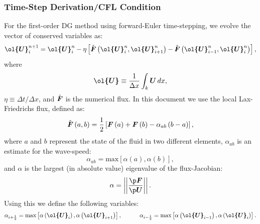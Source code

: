 \documentclass[10pt,preprint]{aastex}
\begin{document}
\subsubsection{Time-Step Derivation/CFL Condition}
For the first-order DG method using forward-Euler time-stepping, we evolve the vector of conserved variables as:
\begin{equation}\label{Eq:1stOrderDG}
    \vect{\ol{U}}^{n+1}_{i}=\vect{\ol{U}}^{n}_{i}-\eta\left[\hat{\vect{F}}\left(\vect{\ol{U}}^{n}_{i},\vect{\ol{U}}^{n}_{i+1}\right)-\hat{\vect{F}}\left(\vect{\ol{U}}^{n}_{i-1},\vect{\ol{U}}^{n}_{i}\right)\right],
\end{equation}
where
\begin{equation*}
    \vect{\ol{U}}\equiv\f{1}{\Delta x}\int_{k}\vect{U}\,dx,
\end{equation*}
$\eta\equiv\Delta t/\Delta x$, and $\hat{\boldsymbol{F}}$ is the numerical flux. In this document we use the local Lax-Friedrichs flux, defined as:
\begin{equation}\label{Eq:LLF}
    \hat{\boldsymbol{F}}\left(a,b\right)=\frac{1}{2}\left[\boldsymbol{F}\left(a\right)+\boldsymbol{F}\left(b\right) - \alpha_{ab}\left(b-a\right)\right],
\end{equation}
where $a$ and $b$ represent the state of the fluid in two different elements, $\alpha_{ab}$ is an estimate for the wave-speed:
\begin{equation*}
    \alpha_{ab}=\text{max}\left[\alpha\left(a\right),\alpha\left(b\right)\right],
\end{equation*}
and $\alpha$ is the largest (in absolute value) eigenvalue of the flux-Jacobian:
\begin{equation*}
    \alpha=\left|\left|\f{\p\vect{F}}{\p\vect{U}}\right|\right|.
\end{equation*}
Using this we define the following variables:
\begin{equation}\label{Eq:EigVals}
    \alpha_{i+\f{1}{2}}=\text{max}\left[\alpha\left(\vect{\ol{U}}_{i}\right),\alpha\left(\vect{\ol{U}}_{i+1}\right)\right],\hspace{3em} \alpha_{i-\f{1}{2}}=\text{max}\left[\alpha\left(\vect{\ol{U}}_{i-1}\right),\alpha\left(\vect{\ol{U}}_{i}\right)\right].
\end{equation}
\end{document}
